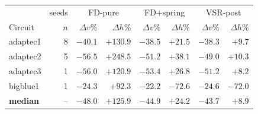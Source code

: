 \begin{tabular}{lr|rr|rr|rr}
\toprule
& seeds & \multicolumn{2}{c|}{FD-pure} & \multicolumn{2}{c|}{FD+spring} & \multicolumn{2}{c}{VSR-post} \\
Circuit & $n$ & $\Delta v$\% & $\Delta h$\% & $\Delta v$\% & $\Delta h$\% & $\Delta v$\% & $\Delta h$\% \\
\midrule
adaptec1 & 8 & $-40.1$ & $+130.9$ & $-38.5$ & $+21.5$ & $-38.3$ & $+9.7$ \\
adaptec2 & 5 & $-56.5$ & $+248.5$ & $-51.2$ & $+38.1$ & $-49.0$ & $+10.3$ \\
adaptec3 & 1 & $-56.0$ & $+120.9$ & $-53.4$ & $+26.8$ & $-51.2$ & $+8.2$ \\
bigblue1 & 1 & $-24.3$ & $+92.3$ & $-22.2$ & $-72.6$ & $-24.6$ & $-72.0$ \\
\midrule
\textbf{median} & -- & $-48.0$ & $+125.9$ & $-44.9$ & $+24.2$ & $-43.7$ & $+8.9$ \\
\bottomrule
\end{tabular}
